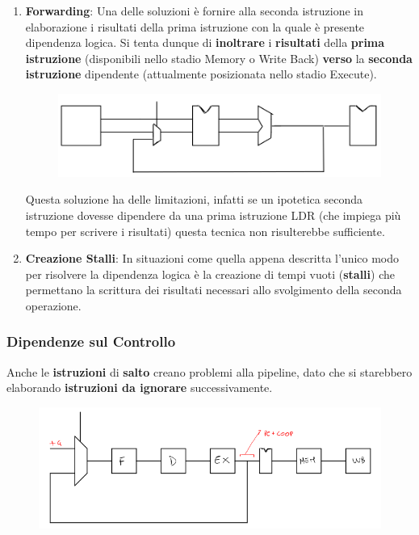 \documentclass{article}
\begin{document}
\begin{enumerate}
    \item \textbf{Forwarding}: Una delle soluzioni è fornire alla seconda istruzione in elaborazione i risultati della prima istruzione con la quale è presente dipendenza logica. Si tenta dunque di \textbf{inoltrare} i \textbf{risultati} della \textbf{prima istruzione} (disponibili nello stadio Memory o Write Back) \textbf{verso} la \textbf{seconda istruzione} dipendente (attualmente posizionata nello stadio Execute).
    \begin{figure}[htbp]
        \center
        \includegraphics[scale=0.375]{img/forwarding.png}
    \end{figure}


    Questa soluzione ha delle limitazioni, infatti se un ipotetica seconda istruzione dovesse dipendere da una prima istruzione LDR (che impiega più tempo per scrivere i risultati) questa tecnica non risulterebbe sufficiente.

    \vspace*{10px}

    \item \textbf{Creazione Stalli}: In situazioni come quella appena descritta l'unico modo per risolvere la dipendenza logica è la creazione di tempi vuoti (\textbf{stalli}) che permettano la scrittura dei risultati necessari allo svolgimento della seconda operazione.
\end{enumerate}

\newpage

\subsubsection{Dipendenze sul Controllo}

Anche le \textbf{istruzioni} di \textbf{salto} creano problemi alla pipeline, dato che si starebbero elaborando \textbf{istruzioni da ignorare} successivamente.

\begin{figure}[htbp]
    \center
    \includegraphics[scale=0.45]{img/forwarding_controllo.png}
\end{figure}
\end{document}
